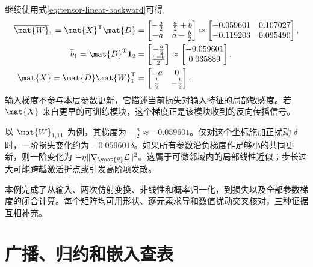 \documentclass[../textbook.tex]{subfiles}
\begin{document}
\begin{example}
继续使用式\eqref{eq:tensor-linear-backward}可得
\begin{align*}
 \overline{\mat{W}}_1=\mat{X}^{\mathrm{T}}\mat{D}
 &=\begin{bmatrix}-\frac{a}{2}&\frac{a}{2}+b\\-a&a-\frac{b}{2}\end{bmatrix}
 \approx\begin{bmatrix}-0.059601&0.107027\\-0.119203&0.095490\end{bmatrix},\\
 \overline b_1=\mat{D}^{\mathrm{T}}\mathbf1_2
 &=\begin{bmatrix}-\frac{a}{2}\\\frac{a-b}{2}\end{bmatrix}
 \approx\begin{bmatrix}-0.059601\\0.035889\end{bmatrix},\\
 \overline{\mat{X}}=\mat{D}\mat{W}_1^{\mathrm{T}}
 &=\begin{bmatrix}-a&0\\\frac{b}{2}&-\frac{b}{2}\end{bmatrix}.
\end{align*}
输入梯度不参与本层参数更新，它描述当前损失对输入特征的局部敏感度。若 $\mat{X}$ 来自更早的可训练模块，这个梯度正是该模块收到的反向传播信号。

以 $\mat{W}_{1,11}$ 为例，其梯度为 $-\frac{a}{2}\approx-0.059601$。仅对这个坐标施加正扰动 $\delta$ 时，一阶损失变化约为 $-0.059601\delta$。如果所有参数沿负梯度作足够小的共同更新，则一阶变化为 $-\eta\|\nabla_{\vect{\theta}}\mathcal L\|^2$。这属于可微邻域内的局部线性近似；步长过大可能跨越激活折点或引发高阶项发散。

本例完成了从输入、两次仿射变换、非线性和概率归一化，到损失以及全部参数梯度的闭合计算。每个矩阵均可用形状、逐元素求导和数值扰动交叉核对，三种证据互相补充。
\end{example}

\section{广播、归约和嵌入查表}
\end{document}
